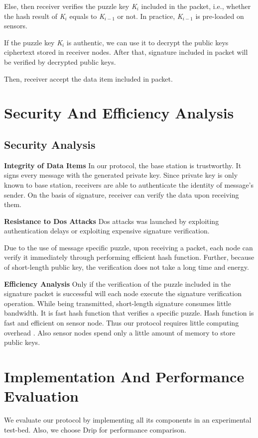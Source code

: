\documentclass{sig-alternate-05-2015}
\begin{document}
Else, then receiver verifies the puzzle key \emph{K$_i$} included in the packet, i.e., whether the hash result of \emph{K$_i$} equals to \emph{K$_{i-1}$} or not. In practice, 
\emph{K$_{i-1}$} is pre-loaded on sensors.

If the puzzle key \emph{K$_i$} is authentic, we can use it to decrypt the  public keys ciphertext stored in receiver nodes. 
After that, signature included in packet will be verified by decrypted public keys. 

Then, receiver accept the data item included in packet.
\section{Security And Efficiency Analysis}
\subsection{Security Analysis}
\textbf{Integrity of Data Items}
In our protocol, the base station is trustworthy. It signs every message with the generated private key. Since private key is only known to base station,  receivers are able to authenticate the identity of message's sender.  On the basis of signature, receiver can verify the data upon receiving them.

\textbf{Resistance to Dos Attacks}
Dos attacks was launched by exploiting authentication delays or exploiting expensive signature verification. 

Due to the use of message specific puzzle, upon receiving a packet, each node can verify it immediately through performing efficient hash function. Further, because of short-length public key, the verification does not take a long time and energy.

\textbf{Efficiency Analysis}   
    Only if the verification of the puzzle included in the signature packet is successful will each node execute the signature verification operation.
	While being transmitted, short-length signature consumes  little bandwidth. It is fast hash  function that verifies a specific puzzle. Hash function is fast and efficient on sensor node.
	Thus our protocol requires little computing overhead . Also sensor nodes spend only a little amount of memory to store public keys.
	

\section{Implementation And Performance Evaluation}
We evaluate our protocol by implementing all its components in an experimental test-bed. Also, we choose Drip for performance comparison.
\end{document}
